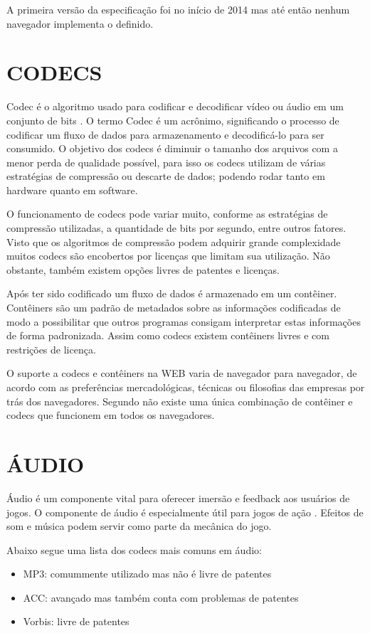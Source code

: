 A primeira versão da especificação foi no início de 2014 mas até
então nenhum navegador implementa o definido.
\section{CODECS}

Codec é o algoritmo usado para codificar e decodificar vídeo ou
áudio em um conjunto de bits \autocite{diveIntohtml}. O termo Codec é
um acrônimo, significando o processo de codificar um fluxo de dados
para armazenamento e decodificá-lo para ser consumido. O objetivo dos
codecs é diminuir o tamanho dos arquivos com a menor perda de qualidade
possível, para isso os codecs utilizam de várias estratégias de
compressão ou descarte de dados; podendo rodar tanto em hardware quanto em
software.

O funcionamento de codecs pode variar muito, conforme as estratégias de
compressão utilizadas, a quantidade de bits por segundo, entre outros
fatores. Visto que os algoritmos de compressão podem adquirir grande
complexidade muitos codecs são encobertos por licenças
que limitam sua utilização. Não obstante, também existem opções
livres de patentes e licenças.

Após ter sido codificado um fluxo de dados é armazenado em um
contêiner. Contêiners são um padrão de metadados sobre as informações
codificadas de modo a possibilitar que outros programas consigam
interpretar estas informações de forma padronizada. Assim como
codecs existem contêiners livres e com restrições de licença.

O suporte a codecs e contêiners na WEB varia de navegador para
navegador, de acordo com as preferências mercadológicas, técnicas
ou filosofias das empresas por trás dos navegadores. Segundo
\cite{diveIntohtml} não existe uma única combinação de contêiner e
codecs que funcionem em todos os navegadores.


\section{ÁUDIO}
\begin{draft}
Áudio é um componente vital para oferecer imersão e feedback aos
usuários de jogos. O componente de áudio é especialmente útil para
jogos de ação \autocite{browserGamesTechnologyAndFuture}. Efeitos de
som e música podem servir como parte da mecânica do jogo.

Abaixo segue uma lista dos codecs mais comuns em áudio:

\end{draft}
\begin{itemize}
    \item MP3: comummente utilizado mas não é livre de patentes
    \item ACC: avançado mas também conta com problemas de patentes
    \item Vorbis: livre de patentes
\end{itemize}

